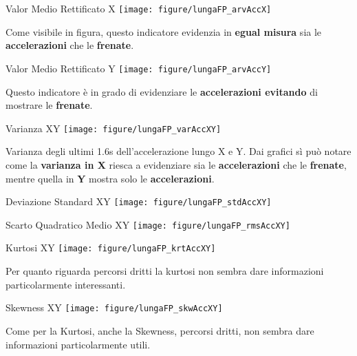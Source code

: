 \documentclass[a4paper, 9pt]{beamer}
\begin{document}
	\begin{frame}{{Valor Medio Rettificato X}}
		\centering\texttt{[image: figure/lungaFP\_arvAccX]}
		
		\vspace{.05\textheight}
		Come visibile in figura, questo indicatore evidenzia in \textbf{egual misura} sia le \textbf{accelerazioni} che le \textbf{frenate}.
	\end{frame}
	
	\begin{frame}{{Valor Medio Rettificato Y}}
		\centering\texttt{[image: figure/lungaFP\_arvAccY]}
		
		\vspace{.05\textheight}
		Questo indicatore è in grado di evidenziare le \textbf{accelerazioni evitando} di mostrare le \textbf{frenate}.
	\end{frame}
	
	\begin{frame}{{Varianza XY}}
		\centering\texttt{[image: figure/lungaFP\_varAccXY]}
		
		\vspace{.05\textheight}
		Varianza degli ultimi 1.6s dell'accelerazione lungo X e Y.
		Dai grafici sì può notare come la \textbf{varianza in X} riesca a evidenziare sia le \textbf{accelerazioni} che le \textbf{frenate}, mentre quella in \textbf{Y} mostra solo le \textbf{accelerazioni}.
	\end{frame}
	
	\begin{frame}{{Deviazione Standard XY}}
		\vspace{.05\textheight}
		\centering\texttt{[image: figure/lungaFP\_stdAccXY]}
	\end{frame}
	
	\begin{frame}{{Scarto Quadratico Medio XY}}
		\vspace{.05\textheight}
		\centering\texttt{[image: figure/lungaFP\_rmsAccXY]}
	\end{frame}
	
	\begin{frame}{{Kurtosi XY}}
		\centering\texttt{[image: figure/lungaFP\_krtAccXY]}	\vspace{.05\textheight}
		
		Per quanto riguarda percorsi dritti la kurtosi non sembra dare informazioni particolarmente interessanti.
	\end{frame}
	
	\begin{frame}{{Skewness XY}}
		\centering\texttt{[image: figure/lungaFP\_skwAccXY]}	\vspace{.05\textheight}
		
		Come per la Kurtosi, anche la Skewness, percorsi dritti, non sembra dare informazioni particolarmente utili.
	\end{frame}
	
\end{document}
